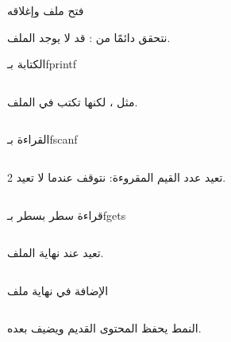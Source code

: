 \documentclass[aspectratio=169, 11pt, t, xcolor={table}]{beamer}
\begin{document}
\begin{frame}{فتح ملف وإغلاقه}
    \begin{center}
    \begin{minipage}{0.72\textwidth}
    \end{minipage}
    \end{center}
    \vspace{0.3cm}
    نتحقق دائمًا من : قد لا يوجد الملف.
\end{frame}

\begin{frame}[t]{الكتابة بـ\textenglish{fprintf}}
    \begin{columns}[T]
        {\small {} مثل ، لكنها تكتب في الملف.\par}
        \vspace{0.3cm}
    \end{columns}
\end{frame}

\begin{frame}[t]{القراءة بـ\textenglish{fscanf}}
    \begin{columns}[T]
        {\small {} تعيد عدد القيم المقروءة: نتوقف عندما لا تعيد 2.\par}
        \vspace{0.3cm}
    \end{columns}
\end{frame}

\begin{frame}[t]{قراءة سطر بسطر بـ\textenglish{fgets}}
    \begin{columns}[T]
        {\small {} تعيد  عند نهاية الملف.\par}
        \vspace{0.3cm}
    \end{columns}
\end{frame}

\begin{frame}[t]{الإضافة في نهاية ملف}
    \begin{columns}[T]
        {\small النمط  يحفظ المحتوى القديم ويضيف بعده.\par}
        \vspace{0.3cm}
    \end{columns}
\end{frame}
\end{document}
